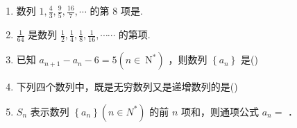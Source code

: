\begin{enumerate}
\item 数列 $1, \frac{4}{3}, \frac{9}{5}, \frac{16}{7}, \cdots$ 的第 8 项是.

\item $\frac{1}{64}$ 是数列 $\frac{1}{2}, \frac{1}{4}, \frac{1}{8}, \frac{1}{16}, \cdots \cdots$ 的第项.

\item 已知 $a_{n+1}-a_n-6=5\left(n \in \mathrm{~N}^*\right)$ ，则数列 $\left\{a_n\right\}$ 是\dotfill{}()

\item 下列四个数列中，既是无穷数列又是递增数列的是\dotfill{}()


\item $S_n$ 表示数列 $\left\{a_n\right\}\left(n \in N^*\right)$ 的前 $n$ 项和，则通项公式 $a_n=$ ．
    
\end{enumerate}

